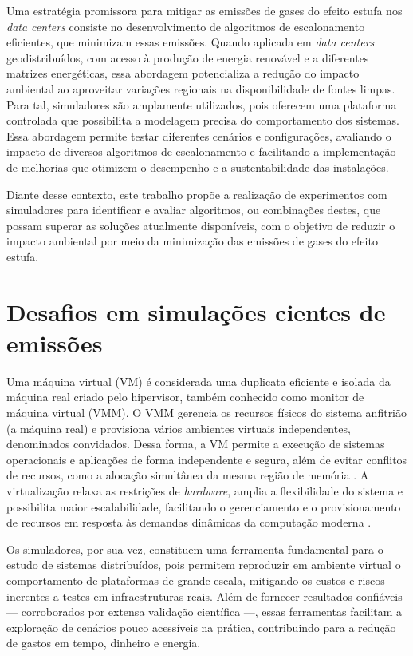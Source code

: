 \documentclass[12pt]{article}
\begin{document}
Uma estratégia promissora para mitigar as emissões de gases do efeito estufa nos \textit{data centers} consiste no desenvolvimento de algoritmos de escalonamento eficientes, que minimizam essas emissões. Quando aplicada em \textit{data centers} geodistribuídos, com acesso à produção de energia renovável e a diferentes matrizes energéticas, essa abordagem potencializa a redução do impacto ambiental ao aproveitar variações regionais na disponibilidade de fontes limpas. Para tal, simuladores são amplamente utilizados, pois oferecem uma plataforma controlada que possibilita a modelagem precisa do comportamento dos sistemas. Essa abordagem permite testar diferentes cenários e configurações, avaliando o impacto de diversos algoritmos de escalonamento e facilitando a implementação de melhorias que otimizem o desempenho e a sustentabilidade das instalações.

Diante desse contexto, este trabalho propõe a realização de experimentos com simuladores para identificar e avaliar algoritmos, ou combinações destes, que possam superar as soluções atualmente disponíveis, com o objetivo de reduzir o impacto ambiental por meio da minimização das emissões de gases do efeito estufa.

\section{Desafios em simulações cientes de emissões} \label{sec:firstpage}

Uma máquina virtual (VM) é considerada uma duplicata eficiente e isolada da máquina real criado pelo hipervisor, também conhecido como monitor de máquina virtual (VMM). O VMM gerencia os recursos físicos do sistema anfitrião (a máquina real) e provisiona vários ambientes virtuais independentes, denominados convidados. Dessa forma, a VM permite a execução de sistemas operacionais e aplicações de forma independente e segura, além de evitar conflitos de recursos, como a alocação simultânea da mesma região de memória \cite{popek:74}. A virtualização relaxa as restrições de \textit{hardware}, amplia a flexibilidade do sistema e possibilita maior escalabilidade, facilitando o gerenciamento e o provisionamento de recursos em resposta às demandas dinâmicas da computação moderna \cite{buyya:13}.

Os simuladores, por sua vez, constituem uma ferramenta fundamental para o estudo de sistemas distribuídos, pois permitem reproduzir em ambiente virtual o comportamento de plataformas de grande escala, mitigando os custos e riscos inerentes a testes em infraestruturas reais. Além de fornecer resultados confiáveis --- corroborados por extensa validação científica ---, essas ferramentas facilitam a exploração de cenários pouco acessíveis na prática, contribuindo para a redução de gastos em tempo, dinheiro e energia.
\end{document}
